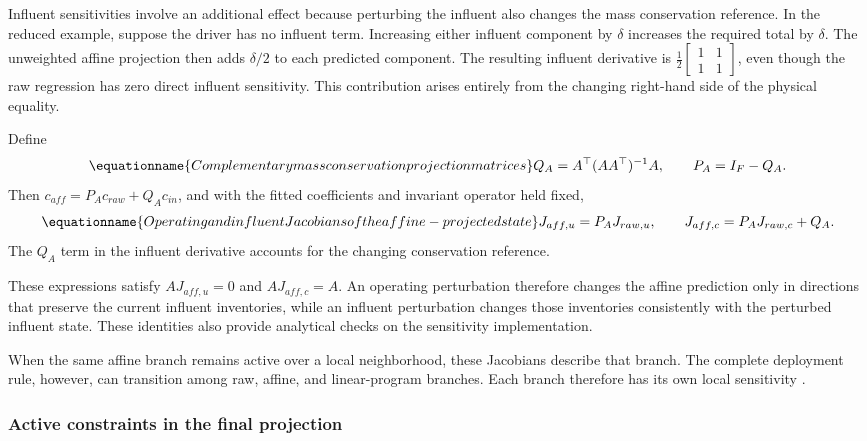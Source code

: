 Influent sensitivities involve an additional effect because perturbing the influent also changes the mass conservation reference. In the reduced example, suppose the driver has no influent term. Increasing either influent component by \(\delta\) increases the required total by \(\delta\). The unweighted affine projection then adds \(\delta/2\) to each predicted component. The resulting influent derivative is \(\frac12\begin{bmatrix}1&1\\1&1\end{bmatrix}\), even though the raw regression has zero direct influent sensitivity. This contribution arises entirely from the changing right-hand side of the physical equality.

Define
\begin{equation}
\equationname{Complementary mass conservation projection matrices}
\label{eq:icsor_projection_matrices}
Q_A=A^\top(AA^\top)^{-1}A,
\qquad P_A=I_F-Q_A.
\end{equation}
Then \(c_{aff}=P_Ac_{raw}+Q_Ac_{in}\), and with the fitted coefficients and invariant operator held fixed,
\begin{equation}
\equationname{Operating and influent Jacobians of the affine-projected state}
\label{eq:icsor_affine_jacobians}
J_{aff,u}=P_AJ_{raw,u},
\qquad J_{aff,c}=P_AJ_{raw,c}+Q_A.
\end{equation}
The \(Q_A\) term in the influent derivative accounts for the changing conservation reference.

These expressions satisfy \(AJ_{aff,u}=0\) and \(AJ_{aff,c}=A\). An operating perturbation therefore changes the affine prediction only in directions that preserve the current influent inventories, while an influent perturbation changes those inventories consistently with the perturbed influent state. These identities also provide analytical checks on the sensitivity implementation.

When the same affine branch remains active over a local neighborhood, these Jacobians describe that branch. The complete deployment rule, however, can transition among raw, affine, and linear-program branches. Each branch therefore has its own local sensitivity \citep{Selerio2026}.

\subsubsection{Active constraints in the final projection}

